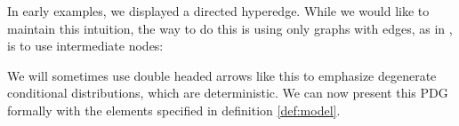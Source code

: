 \documentclass{article}
\numberwithin{equation}{section}
\begin{document}
	\begin{example}[continues=ex:planet]
		In early examples, we displayed a directed hyperedge. While we would like to maintain this intuition, the way to do this is using only graphs with edges, as in , is to use intermediate nodes:
		
		\begin{center}
		\end{center}
		We will sometimes use double headed arrows like this to emphasize degenerate conditional distributions, which are deterministic.
		We can now present this PDG formally with the elements specified in definition \ref{def:model}.
		

\end{example}
\end{document}
